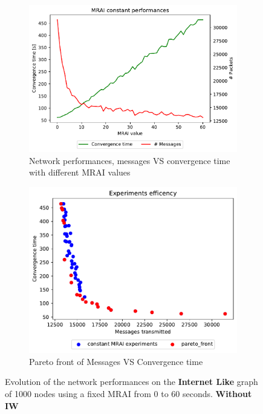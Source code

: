 \begin{figure}[h]
     \centering
     \begin{subfigure}[b]{0.45\textwidth}
         \centering
         \includegraphics[width=\textwidth]{images/internet_like/1000/constantMRAI/internet_like-constant-noIW_mrai_evolution.pdf}
		 \caption{Network performances, messages VS convergence time with different
			\ac{MRAI} values}
         \label{fig:internt_like_1000_constant_noIW_evolution_evolution}
     \end{subfigure}
     \hfill
     \begin{subfigure}[b]{0.45\textwidth}
         \centering
         \includegraphics[width=\textwidth]{images/internet_like/1000/constantMRAI/internet_like-constant-noIW.pdf}
		 \caption{Pareto front of Messages VS Convergence time}
         \label{fig:internt_like_1000_constant_noIW_evolution_paretoFront}
     \end{subfigure}
		\caption{Evolution of the network performances on the \textbf{Internet Like} graph 
			of \num{1000} nodes using a fixed \ac{MRAI} from \num{0} to \num{60} seconds.
			\textbf{Without \ac{IW}}}
        \label{fig:internet_like_1000_constant_evolution_noIW}
\end{figure}

